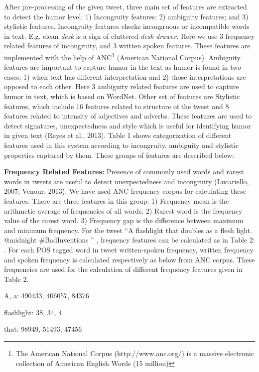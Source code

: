 \documentclass{article} %
\begin{document}
\noindent After pre-processing of the given tweet, three main set of features are extracted to detect the humor level: 1) Incongruity features; 2) ambiguity features; and 3) stylistic features. Incongruity features checks incongruous or incompatible words in text. E.g. clean \textit{desk} is a sign of cluttered \textit{desk drawer.}  Here we use 3 frequency related features of incongruity, and 3 written spoken features. These features are implemented with the help of ANC\footnote{ The American National Corpus ($  $http://www.anc.org/) is a massive electronic collection of American English Words (15 million)} (American National Corpus). Ambiguity features are important to capture humor in the text as humor is found in two cases: 1) when text has different interpretation and 2) those interpretations are opposed to each other. Here 3 ambiguity related features are used to capture humor in text, which is based on WordNet. Other set of features are Stylistic features, which include 16 features related to structure of the tweet and 8 features related to intensity of adjectives and adverbs. These features are used to detect signatures, unexpectedness and style which is useful for identifying humor in given text (Reyes et al., 2013).  Table 1 shows categorization of different features used in this system according to incongruity, ambiguity and stylistic properties captured by them. These groups of features are described below:

\noindent \textbf{Frequency Related Features: }Presence of commonly used words and rarest words in tweets are useful to detect unexpectedness and incongruity (Lucariello, 2007; Venour, 2013). We have used ANC frequency corpus for calculating these features. There are three features in this group: 1) Frequency mean is the arithmetic average of frequencies of all words. 2) Rarest word is the frequency value of the rarest word. 3) Frequency gap is the difference between maximum and minimum frequency. For the tweet ``A flashlight that doubles as a flesh light. @midnight \#BadInventions '' , frequency features can be calculated as in Table 2:  . For each POS tagged word in tweet written-spoken frequency, written frequency and spoken frequency is calculated respectively as below from ANC corpus. These frequencies are used for the calculation of different frequency features given in Table 2.

\noindent A, a: 490433, 406057, 84376

\noindent flashlight: 38, 34, 4

\noindent that: 98949, 51493, 47456
\end{document}
